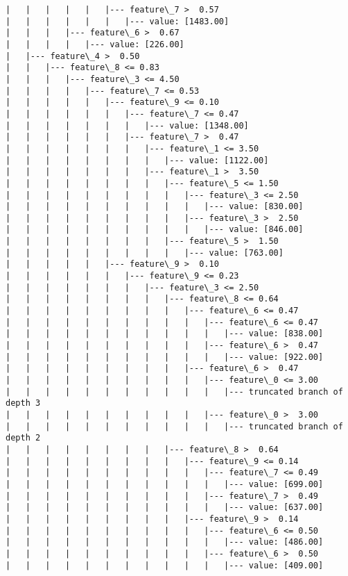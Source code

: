 \documentclass[11pt]{article}
\begin{document}
\begin{Verbatim}[commandchars=\\\{\}]
|   |   |   |   |   |--- feature\_7 >  0.57
|   |   |   |   |   |   |--- value: [1483.00]
|   |   |   |--- feature\_6 >  0.67
|   |   |   |   |--- value: [226.00]
|   |--- feature\_4 >  0.50
|   |   |--- feature\_8 <= 0.83
|   |   |   |--- feature\_3 <= 4.50
|   |   |   |   |--- feature\_7 <= 0.53
|   |   |   |   |   |--- feature\_9 <= 0.10
|   |   |   |   |   |   |--- feature\_7 <= 0.47
|   |   |   |   |   |   |   |--- value: [1348.00]
|   |   |   |   |   |   |--- feature\_7 >  0.47
|   |   |   |   |   |   |   |--- feature\_1 <= 3.50
|   |   |   |   |   |   |   |   |--- value: [1122.00]
|   |   |   |   |   |   |   |--- feature\_1 >  3.50
|   |   |   |   |   |   |   |   |--- feature\_5 <= 1.50
|   |   |   |   |   |   |   |   |   |--- feature\_3 <= 2.50
|   |   |   |   |   |   |   |   |   |   |--- value: [830.00]
|   |   |   |   |   |   |   |   |   |--- feature\_3 >  2.50
|   |   |   |   |   |   |   |   |   |   |--- value: [846.00]
|   |   |   |   |   |   |   |   |--- feature\_5 >  1.50
|   |   |   |   |   |   |   |   |   |--- value: [763.00]
|   |   |   |   |   |--- feature\_9 >  0.10
|   |   |   |   |   |   |--- feature\_9 <= 0.23
|   |   |   |   |   |   |   |--- feature\_3 <= 2.50
|   |   |   |   |   |   |   |   |--- feature\_8 <= 0.64
|   |   |   |   |   |   |   |   |   |--- feature\_6 <= 0.47
|   |   |   |   |   |   |   |   |   |   |--- feature\_6 <= 0.47
|   |   |   |   |   |   |   |   |   |   |   |--- value: [838.00]
|   |   |   |   |   |   |   |   |   |   |--- feature\_6 >  0.47
|   |   |   |   |   |   |   |   |   |   |   |--- value: [922.00]
|   |   |   |   |   |   |   |   |   |--- feature\_6 >  0.47
|   |   |   |   |   |   |   |   |   |   |--- feature\_0 <= 3.00
|   |   |   |   |   |   |   |   |   |   |   |--- truncated branch of depth 3
|   |   |   |   |   |   |   |   |   |   |--- feature\_0 >  3.00
|   |   |   |   |   |   |   |   |   |   |   |--- truncated branch of depth 2
|   |   |   |   |   |   |   |   |--- feature\_8 >  0.64
|   |   |   |   |   |   |   |   |   |--- feature\_9 <= 0.14
|   |   |   |   |   |   |   |   |   |   |--- feature\_7 <= 0.49
|   |   |   |   |   |   |   |   |   |   |   |--- value: [699.00]
|   |   |   |   |   |   |   |   |   |   |--- feature\_7 >  0.49
|   |   |   |   |   |   |   |   |   |   |   |--- value: [637.00]
|   |   |   |   |   |   |   |   |   |--- feature\_9 >  0.14
|   |   |   |   |   |   |   |   |   |   |--- feature\_6 <= 0.50
|   |   |   |   |   |   |   |   |   |   |   |--- value: [486.00]
|   |   |   |   |   |   |   |   |   |   |--- feature\_6 >  0.50
|   |   |   |   |   |   |   |   |   |   |   |--- value: [409.00]

\end{Verbatim}
\end{document}
